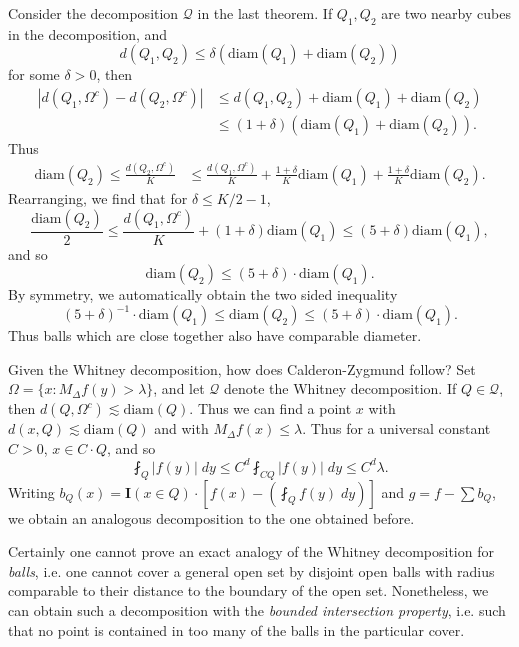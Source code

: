 \begin{remark}
    Consider the decomposition $\mathcal{Q}$ in the last theorem. If $Q_1,Q_2$ are two nearby cubes in the decomposition, and
    \[ d(Q_1,Q_2) \leq \delta ( \text{diam}(Q_1) + \text{diam}(Q_2)) \]
    for some $\delta > 0$, then
    \begin{align*}
        | d(Q_1,\Omega^c) - d(Q_2,\Omega^c) | &\leq d(Q_1,Q_2) + \text{diam}(Q_1) + \text{diam}(Q_2)\\
        &\leq (1 + \delta) (\text{diam}(Q_1) + \text{diam}(Q_2)).
    \end{align*}
    Thus
    \begin{align*}
        \text{diam}(Q_2) \leq \frac{d(Q_2,\Omega^c)}{K} &\leq \frac{d(Q_1,\Omega^c)}{K} + \frac{1 + \delta}{K} \text{diam}(Q_1) + \frac{1 + \delta}{K} \text{diam}(Q_2).
    \end{align*}
    Rearranging, we find that for $\delta \leq K/2 - 1$,
    \[ \frac{\text{diam}(Q_2)}{2} \leq \frac{d(Q_1,\Omega^c)}{K} + (1 + \delta) \text{diam}(Q_1) \leq (5 + \delta) \text{diam}(Q_1), \]
    and so
    \[ \text{diam}(Q_2) \leq (5 + \delta) \cdot \text{diam}(Q_1). \]
    By symmetry, we automatically obtain the two sided inequality
    \[ (5 + \delta)^{-1} \cdot \text{diam}(Q_1) \leq \text{diam}(Q_2) \leq (5 + \delta) \cdot \text{diam}(Q_1). \]
    Thus balls which are close together also have comparable diameter.
\end{remark}

Given the Whitney decomposition, how does Calderon-Zygmund follow? Set $\Omega = \{ x : M_\Delta f(y) > \lambda \}$, and let $\mathcal{Q}$ denote the Whitney decomposition. If $Q \in \mathcal{Q}$, then $d(Q,\Omega^c) \lesssim \text{diam}(Q)$. Thus we can find a point $x$ with $d(x,Q) \lesssim \text{diam}(Q)$ and with $M_\Delta f(x) \leq \lambda$. Thus for a universal constant $C > 0$, $x \in C \cdot Q$, and so
%
\[ \fint_Q |f(y)|\; dy \leq C^d \fint_{CQ} |f(y)|\; dy \leq C^d \lambda. \]
%
Writing $b_Q(x) = \mathbf{I}(x \in Q) \cdot [f(x) - (\fint_Q f(y)\; dy)]$ and $g = f - \sum b_Q$, we obtain an analogous decomposition to the one obtained before.

Certainly one cannot prove an exact analogy of the Whitney decomposition for \emph{balls}, i.e. one cannot cover a general open set by disjoint open balls with radius comparable to their distance to the boundary of the open set. Nonetheless, we can obtain such a decomposition with the \emph{bounded intersection property}, i.e. such that no point is contained in too many of the balls in the particular cover.

